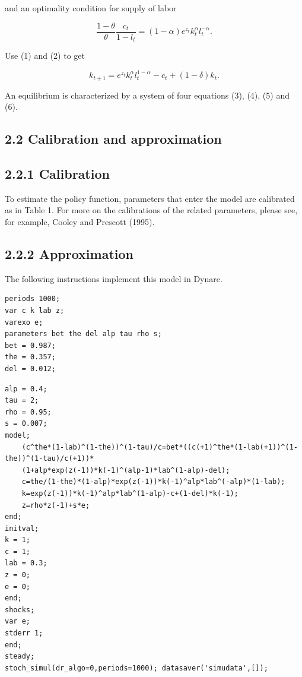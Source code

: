 \documentclass[10pt]{article}
\begin{document}
and an optimality condition for supply of labor


\begin{equation*}
\frac{1-\theta}{\theta} \frac{c_{t}}{1-l_{t}}=(1-\alpha) e^{z_{t}} k_{t}^{\alpha} l_{t}^{-\alpha} . \tag{5}
\end{equation*}


Use (1) and (2) to get


\begin{equation*}
k_{t+1}=e^{z_{t}} k_{t}^{\alpha} l_{t}^{1-\alpha}-c_{t}+(1-\delta) k_{t} . \tag{6}
\end{equation*}


An equilibrium is characterized by a system of four equations (3), (4), (5) and (6).

\subsection*{2.2 Calibration and approximation}
\subsection*{2.2.1 Calibration}
To estimate the policy function, parameters that enter the model are calibrated as in Table 1. For more on the calibrations of the related parameters, please see, for example, Cooley and Prescott (1995).

\subsection*{2.2.2 Approximation}
The following instructions implement this model in Dynare.

\begin{verbatim}
periods 1000;
var c k lab z;
varexo e;
parameters bet the del alp tau rho s;
bet = 0.987;
the = 0.357;
del = 0.012;
\end{verbatim}

\begin{verbatim}
alp = 0.4;
tau = 2;
rho = 0.95;
s = 0.007;
model;
    (c^the*(1-lab)^(1-the))^(1-tau)/c=bet*((c(+1)^the*(1-lab(+1))^(1-the))^(1-tau)/c(+1))*
    (1+alp*exp(z(-1))*k(-1)^(alp-1)*lab^(1-alp)-del);
    c=the/(1-the)*(1-alp)*exp(z(-1))*k(-1)^alp*lab^(-alp)*(1-lab);
    k=exp(z(-1))*k(-1)^alp*lab^(1-alp)-c+(1-del)*k(-1);
    z=rho*z(-1)+s*e;
end;
initval;
k = 1;
c = 1;
lab = 0.3;
z = 0;
e = 0;
end;
shocks;
var e;
stderr 1;
end;
steady;
stoch_simul(dr_algo=0,periods=1000); datasaver('simudata',[]);
\end{verbatim}
\end{document}
